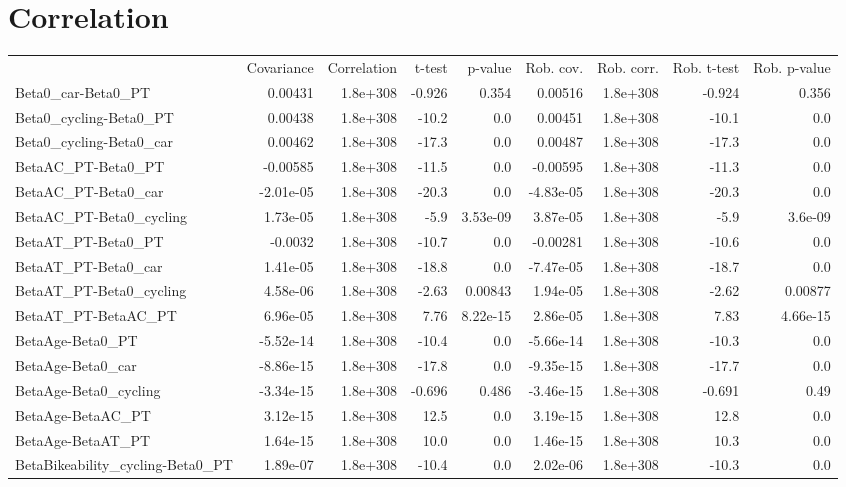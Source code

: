\section{Correlation}
\begin{tabular}{lrrrrrrrr}
 & Covariance & Correlation & t-test & p-value & Rob. cov. & Rob. corr. & Rob. t-test & Rob. p-value \\
Beta0_car-Beta0_PT & 0.00431 & 1.8e+308 & -0.926 & 0.354 & 0.00516 & 1.8e+308 & -0.924 & 0.356 \\
Beta0_cycling-Beta0_PT & 0.00438 & 1.8e+308 & -10.2 & 0.0 & 0.00451 & 1.8e+308 & -10.1 & 0.0 \\
Beta0_cycling-Beta0_car & 0.00462 & 1.8e+308 & -17.3 & 0.0 & 0.00487 & 1.8e+308 & -17.3 & 0.0 \\
BetaAC_PT-Beta0_PT & -0.00585 & 1.8e+308 & -11.5 & 0.0 & -0.00595 & 1.8e+308 & -11.3 & 0.0 \\
BetaAC_PT-Beta0_car & -2.01e-05 & 1.8e+308 & -20.3 & 0.0 & -4.83e-05 & 1.8e+308 & -20.3 & 0.0 \\
BetaAC_PT-Beta0_cycling & 1.73e-05 & 1.8e+308 & -5.9 & 3.53e-09 & 3.87e-05 & 1.8e+308 & -5.9 & 3.6e-09 \\
BetaAT_PT-Beta0_PT & -0.0032 & 1.8e+308 & -10.7 & 0.0 & -0.00281 & 1.8e+308 & -10.6 & 0.0 \\
BetaAT_PT-Beta0_car & 1.41e-05 & 1.8e+308 & -18.8 & 0.0 & -7.47e-05 & 1.8e+308 & -18.7 & 0.0 \\
BetaAT_PT-Beta0_cycling & 4.58e-06 & 1.8e+308 & -2.63 & 0.00843 & 1.94e-05 & 1.8e+308 & -2.62 & 0.00877 \\
BetaAT_PT-BetaAC_PT & 6.96e-05 & 1.8e+308 & 7.76 & 8.22e-15 & 2.86e-05 & 1.8e+308 & 7.83 & 4.66e-15 \\
BetaAge-Beta0_PT & -5.52e-14 & 1.8e+308 & -10.4 & 0.0 & -5.66e-14 & 1.8e+308 & -10.3 & 0.0 \\
BetaAge-Beta0_car & -8.86e-15 & 1.8e+308 & -17.8 & 0.0 & -9.35e-15 & 1.8e+308 & -17.7 & 0.0 \\
BetaAge-Beta0_cycling & -3.34e-15 & 1.8e+308 & -0.696 & 0.486 & -3.46e-15 & 1.8e+308 & -0.691 & 0.49 \\
BetaAge-BetaAC_PT & 3.12e-15 & 1.8e+308 & 12.5 & 0.0 & 3.19e-15 & 1.8e+308 & 12.8 & 0.0 \\
BetaAge-BetaAT_PT & 1.64e-15 & 1.8e+308 & 10.0 & 0.0 & 1.46e-15 & 1.8e+308 & 10.3 & 0.0 \\
BetaBikeability_cycling-Beta0_PT & 1.89e-07 & 1.8e+308 & -10.4 & 0.0 & 2.02e-06 & 1.8e+308 & -10.3 & 0.0 \\

\end{tabular}
